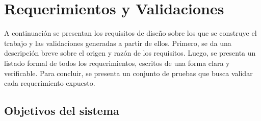 


\section{Requerimientos y Validaciones}

A continuación se presentan los requisitos de diseño sobre los que se construye el trabajo y las validaciones generadas a partir de ellos. Primero, se da una descripción breve sobre el origen y razón de los requisitos. Luego, se presenta un listado formal de todos los requerimientos, escritos de una forma clara y verificable. Para concluir, se presenta un conjunto de pruebas que busca validar cada requerimiento expuesto.

\subsection{Objetivos del sistema}

